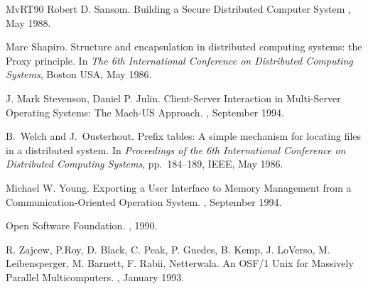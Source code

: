 \begin{thebibliography}{MvRT{\etalchar{+}}90}
Robert D. Sansom.
\newblock Building a Secure Distributed Computer System
,
  May 1988.

Marc Shapiro.
\newblock Structure and encapsulation in distributed computing systems: the
  {P}roxy principle.
\newblock In {\em The 6th International Conference on Distributed Computing
  Systems}, Boston {{USA}}, May 1986.

J. Mark Stevenson, Daniel P. Julin.
\newblock Client-Server Interaction in Multi-Server Operating Systems: The Mach-US Approach.
,
  September 1994.

B.~Welch and J.~Ousterhout.
\newblock Prefix tables: A simple mechanism for locating
  files in a distributed system.
\newblock In {\em Proceedings of the 6th International
  Conference on Distributed Computing Systems}, pp.~184--189, IEEE, May 1986.

Michael W. Young.
\newblock Exporting a User Interface to Memory Management from a
Communication-Oriented Operation System.
,
  September 1994.

Open Software Foundation.
, 1990.

R. Zajcew, P.Roy, D. Black, C. Peak, P. Guedes, B. Kemp, J. LoVerso,
M. Leibensperger, M. Barnett, F. Rabii, Netterwala.
\newblock An OSF/1 Unix for Massively Parallel Multicomputers.
, January 1993.

\end{thebibliography}


